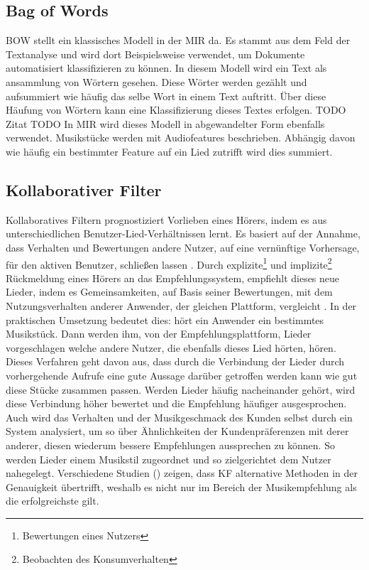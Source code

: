 \documentclass[twosided,a4,10pt]{article}
\begin{document}
\begin{multicols}{2}
		\subsection{Bag of Words}
		BOW stellt ein klassisches Modell in der MIR da. Es stammt aus dem Feld der Textanalyse und wird dort Beispielsweise verwendet, um Dokumente automatisiert klassifizieren zu können. In diesem Modell wird ein Text als ansammlung von Wörtern gesehen. Diese Wörter werden gezählt und aufsummiert wie häufig das selbe Wort in einem Text auftritt. Über diese Häufung von Wörtern kann eine Klassifizierung dieses Textes erfolgen. TODO Zitat TODO In MIR wird dieses Modell in abgewandelter Form ebenfalls verwendet. Musikstücke werden mit Audiofeatures beschrieben. Abhängig davon wie häufig ein bestimmter Feature auf ein Lied zutrifft wird dies summiert.
		\subsection{Kollaborativer Filter}
		Kollaboratives Filtern prognostiziert Vorlieben eines Hörers, indem es aus unterschiedlichen Benutzer-Lied-Verhältnissen lernt. Es basiert auf der Annahme, dass Verhalten und Bewertungen andere Nutzer, auf eine vernünftige Vorhersage, für den aktiven Benutzer, schließen lassen \cite{celma}. Durch explizite\footnote[4]{ Bewertungen eines Nutzers} und implizite\footnote[5]{Beobachten des Konsumverhalten} Rückmeldung eines Hörers an das Empfehlungssystem, empfiehlt dieses neue Lieder, indem es Gemeinsamkeiten, auf Basis seiner Bewertungen, mit dem Nutzungsverhalten anderer Anwender, der gleichen Plattform, vergleicht \cite{mcfee}.\newline
		In der praktischen Umsetzung bedeutet dies: hört ein Anwender ein bestimmtes Musikstück. Dann werden ihm, von der Empfehlungsplattform, Lieder vorgeschlagen welche andere Nutzer, die ebenfalls dieses Lied hörten, hören. Dieses Verfahren geht davon aus, dass durch die Verbindung der Lieder durch vorhergehende Aufrufe eine gute Aussage darüber getroffen werden kann wie gut diese Stücke zusammen passen. Werden Lieder häufig nacheinander gehört, wird diese Verbindung höher bewertet und die Empfehlung häufiger ausgesprochen. Auch wird das Verhalten und der Musikgeschmack des Kunden selbst durch ein System analysiert, um so über Ähnlichkeiten der Kundenpräferenzen mit derer anderer, diesen wiederum bessere Empfehlungen aussprechen zu können. So werden Lieder einem Musikstil zugeordnet und so zielgerichtet dem Nutzer nahegelegt.\newline
		Verschiedene Studien (\cite{mcfee}\cite{barrington}) zeigen, dass KF alternative Methoden in der Genauigkeit übertrifft, weshalb es nicht nur im Bereich der Musikempfehlung als die erfolgreichste gilt.\newline

\end{multicols}
\end{document}
